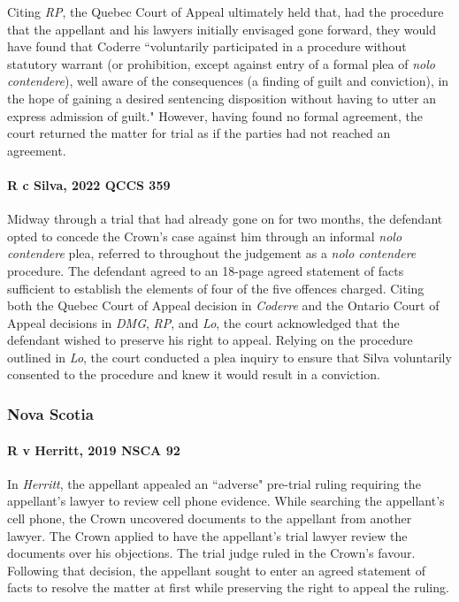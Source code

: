Citing \textit{RP}, the Quebec Court of Appeal ultimately held that, had the procedure that the appellant and his lawyers initially envisaged gone forward, they would have found that Coderre ``voluntarily participated in a procedure without statutory warrant (or prohibition, except against entry of a formal plea of \textit{nolo contendere}), well aware of the consequences (a finding of guilt and conviction), in the hope of gaining a desired sentencing disposition without having to utter an express admission of guilt." However, having found no formal agreement, the court returned the matter for trial as if the parties had not reached an agreement.

\paragraph{R c Silva, 2022 QCCS 359\\}

Midway through a trial that had already gone on for two months, the defendant opted to concede the Crown's case against him through an informal \textit{nolo contendere} plea, referred to throughout the judgement as a \textit{nolo contendere} procedure. The defendant agreed to an 18-page agreed statement of facts sufficient to establish the elements of four of the five offences charged. Citing both the Quebec Court of Appeal decision in \textit{Coderre} and the Ontario Court of Appeal decisions in \textit{DMG}, \textit{RP}, and \textit{Lo}, the court acknowledged that the defendant wished to preserve his right to appeal. Relying on the procedure outlined in \textit{Lo}, the court conducted a plea inquiry to ensure that Silva voluntarily consented to the procedure and knew it would result in a conviction.

\subsubsection{Nova Scotia}

\paragraph{R v Herritt, 2019 NSCA 92\\}

In \textit{Herritt}, the appellant appealed an ``adverse" pre-trial ruling requiring the appellant's lawyer to review cell phone evidence. While searching the appellant's cell phone, the Crown uncovered documents to the appellant from another lawyer. The Crown applied to have the appellant's trial lawyer review the documents over his objections. The trial judge ruled in the Crown's favour. Following that decision, the appellant sought to enter an agreed statement of facts to resolve the matter at first while preserving the right to appeal the ruling.

